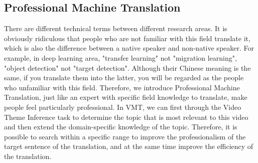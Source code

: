\documentclass{article}
\begin{document}
\subsection{Professional Machine Translation}

There are different technical terms between different research areas. It is obviously ridiculous that people who are not familiar with this field translate it, which is also the difference between a native speaker and non-native speaker. For example, in deep learning area, "transfer learning" not "migration learning", "object detection" not "target detection". Although their Chinese meaning is the same, if you translate them into the latter, you will be regarded as the people who unfamiliar with this field. Therefore, we introduce Professional Machine Translation, just like an expert with specific field knowledge to translate, make people feel particularly professional. In VMT, we can first through the Video Theme Inference task to determine the topic that is most relevant to this video and then extend the domain-specific knowledge of the topic. Therefore, it is possible to search within a specific range to improve the professionalism of the target sentence of the translation, and at the same time improve the efficiency of the translation. 











  






\end{document}
